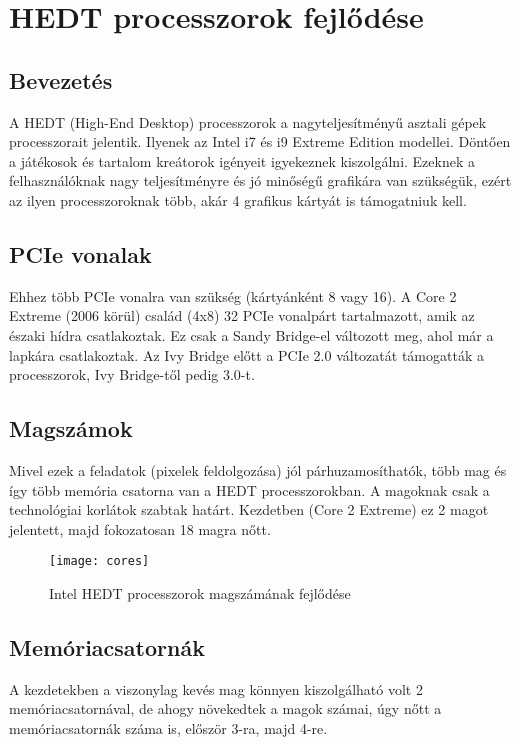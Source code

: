 
\chapter{HEDT processzorok fejlődése}

\section{Bevezetés}

A HEDT (High-End Desktop) processzorok a nagyteljesítményű asztali gépek processzorait jelentik.
Ilyenek az Intel i7 és i9 Extreme Edition modellei.
Döntően a játékosok és tartalom kreátorok igényeit igyekeznek kiszolgálni.
Ezeknek a felhasználóknak nagy teljesítményre és jó minőségű grafikára van szükségük, ezért az ilyen processzoroknak több, akár 4 grafikus kártyát is támogatniuk kell.

\section{PCIe vonalak}
Ehhez több PCIe vonalra van szükség (kártyánként 8 vagy 16).
A Core 2 Extreme (2006 körül) család (4x8) 32 PCIe vonalpárt tartalmazott, amik az északi hídra csatlakoztak.
Ez csak a Sandy Bridge-el változott meg, ahol már a lapkára csatlakoztak.
Az Ivy Bridge előtt a PCIe 2.0 változatát támogatták a processzorok, Ivy Bridge-től pedig 3.0-t.

\section{Magszámok}
Mivel ezek a feladatok (pixelek feldolgozása) jól párhuzamosíthatók, több mag és így több memória csatorna van a HEDT processzorokban.
A magoknak csak a technológiai korlátok szabtak határt.
Kezdetben (Core 2 Extreme) ez 2 magot jelentett, majd fokozatosan 18 magra nőtt.

\begin{figure}[H]
    \texttt{[image: cores]}
    \centering
    \caption{Intel HEDT processzorok magszámának fejlődése}
    \label{fig:cores}
\end{figure}

\section{Memóriacsatornák}
A kezdetekben a viszonylag kevés mag könnyen kiszolgálható volt 2 memóriacsatornával, de ahogy növekedtek a magok számai, úgy nőtt a memóriacsatornák száma is, először 3-ra, majd 4-re.

